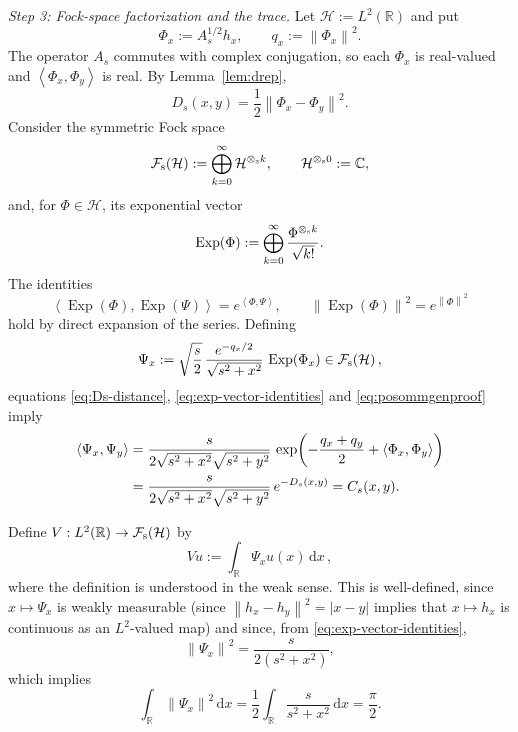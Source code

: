\documentclass[11pt]{article}
\theoremstyle{definition}
\theoremstyle{remark}
\newcommand{\R}{\mathbb{R}}
\newcommand{\C}{\mathbb{C}}
\newcommand{\Fock}{\mathcal{F}}
\newcommand{\ip}[2]{\left\langle #1,#2\right\rangle}
\newcommand{\norm}[1]{\left\lVert #1\right\rVert}
\newcommand{\abs}[1]{\left\lvert #1\right\rvert}
\newcommand{\dd}{\,\mathrm{d}}
\begin{document}
\medskip

\emph{Step 3: Fock-space factorization and the trace.}
Let $\mathcal H:=L^2(\R)$ and put
\[
\Phi_x:=A_s^{1/2}h_x,
\qquad
q_x:=\norm{\Phi_x}^2.
\]
The operator $A_s$ commutes with complex conjugation, so each
$\Phi_x$ is real-valued and $\ip{\Phi_x}{\Phi_y}$ is real.  By
Lemma~\ref{lem:drep},
\begin{equation}\label{eq:Ds-distance}
D_s(x,y)=\frac12\norm{\Phi_x-\Phi_y}^2.
\end{equation}
Consider the symmetric Fock space
\[
\Fock_{\rm s}(\mathcal H):=\bigoplus_{k=0}^\infty \mathcal H^{\otimes_{\rm s}k},
\qquad \mathcal H^{\otimes_{\rm s}0}:=\C,
\]
and, for $\Phi\in \mathcal H$, its exponential vector
\[
\operatorname{Exp}(\Phi)
:=\bigoplus_{k=0}^\infty\frac{\Phi^{\otimes_{\rm s}k}}{\sqrt{k!}}.
\]
The identities
\begin{equation}\label{eq:exp-vector-identities}
\ip{\operatorname{Exp}(\Phi)}{\operatorname{Exp}(\Psi)}
=e^{\ip{\Phi}{\Psi}},
\qquad
\norm{\operatorname{Exp}(\Phi)}^2=e^{\norm{\Phi}^2}
\end{equation}
hold by direct expansion of the series. Defining
\begin{equation}\label{eq:Psi-x}
\Psi_x:=\sqrt{\frac{s}{2}}\,
\frac{e^{-q_x/2}}{\sqrt{s^2+x^2}}\,
\operatorname{Exp}(\Phi_x)
\in\Fock_{\rm s}(\mathcal H) \,,
\end{equation}
equations \eqref{eq:Ds-distance},
\eqref{eq:exp-vector-identities} and \eqref{eq:posommgenproof} imply
\begin{align}
\ip{\Psi_x}{\Psi_y}
&=\frac{s}{2\sqrt{s^2+x^2}\sqrt{s^2+y^2}} \,
\exp\!\left(-\frac{q_x+q_y}{2}+\ip{\Phi_x}{\Phi_y}\right)\notag\\
&=\frac{s}{2\sqrt{s^2+x^2}\sqrt{s^2+y^2}} \,e^{-D_s(x,y)}
=C_s(x,y).
\label{eq:Cs-Gram}
\end{align}

Define $V:L^2(\R)\to\Fock_{\rm s}(\mathcal H)$ by
\[
Vu:=\int_{\R}\Psi_xu(x)\dd x \,,
\]
where the definition is understood in the weak sense. This is well-defined, since $x\mapsto\Psi_x$ is weakly measurable (since $\norm{h_x-h_y}^2=\abs{x-y}$ implies that $x\mapsto h_x$ is continuous as an $L^2$-valued map) and since, from
\eqref{eq:exp-vector-identities},
\begin{equation}\label{eq:Psi-norm}
\norm{\Psi_x}^2
=\frac{s}{2(s^2+x^2)},
\end{equation}
which implies
\begin{equation}\label{eq:Psi-L2}
\int_{\R}\norm{\Psi_x}^2\dd x
=\frac12\int_{\R}\frac{s}{s^2+x^2}\dd x
=\frac\pi2.
\end{equation}
\end{document}
